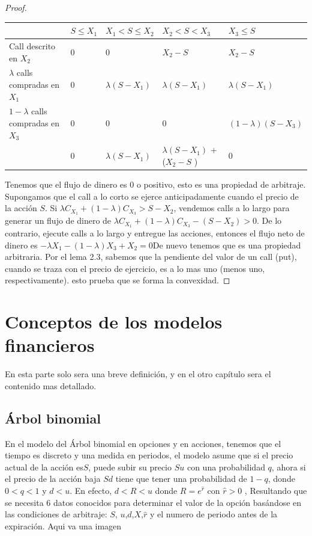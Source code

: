 \begin{defn}
\begin{proof}
								
							\begin{longtable}{|l|l|l|l|l|}
									\hline 
									& $ S\leq X_{1} $ & $ X_{1}< S \leq X_{2} $  & $ X_{2}<S<X_{3} $  & $ X_{3}\leq S $  \\ 
									\hline 
									Call descrito en $ X_{2} $& 0  & 0  & $ X_{2}-S $ & $ X_{2}-S $  \\ 
									\hline 
									$ \lambda $ calls compradas en $ X_{1} $& 0  & $ \lambda (S-X_{1}) $ &$ \lambda (S-X_{1}) $  & $ \lambda (S-X_{1}) $  \\ 
									\hline 
									$1- \lambda $ calls compradas en $ X_{3} $& 0  & 0  & 0 & $(1- \lambda )(S-X_{3}) $   \\ 
									\hline 
									& 0 &$ \lambda (S-X_{1}) $  & $ \lambda (S-X_{1}) $ + ($ X_{2}-S $ )  & 0 \\ 
									\hline 
							\end{longtable}  
								 Tenemos que el flujo de dinero es 0 o positivo, esto es una propiedad de arbitraje.
								 \newline
								 Supongamos que el call a lo corto se ejerce anticipadamente cuando el precio de la acción $ S $. Si 	$  \lambda C _{X_{1}} + (1-\lambda) C _{X_{3}}> S-X_{2} $, vendemos calls a lo largo para generar un flujo de dinero de 	$  \lambda C _{X_{1}} + (1-\lambda) C _{X_{3}} - (S-X_{2})>0 $. De lo contrario, ejecute calls a lo largo y entregue las acciones, entonces el flujo neto de  dinero es $ -\lambda X_{1}- (1-\lambda)X_{3}+X_{2} = 0  $De nuevo tenemos que es una propiedad arbitraria. \newline
								 Por el lema 2.3, sabemos que la pendiente del valor de un call (put), cuando se traza con el precio de ejercicio, es a lo mas uno (menos uno, respectivamente). esto prueba que se forma la convexidad.
									 \end{proof}
									 
									 \section	{Conceptos de los modelos financieros }
									En esta parte solo sera una breve definición, y en el otro capítulo sera el contenido mas detallado.
									\subsection	{Árbol binomial}
									
									En el  modelo del Árbol binomial en opciones y en acciones, tenemos que el tiempo es discreto y una medida en periodos, el modelo asume que si el precio actual de la acción es$ S $, puede subir su precio $ Su $ con una probabilidad $ q $, ahora si el precio de la acción baja $ Sd $ tiene que tener una probabilidad de $ 1-q $, donde $ 0<q<1 $ y $ d<u $. En efecto, $ d<R<u $ donde $ R=e^{\widehat{r}} $ con $ \widehat{r} >0 $ , Resultando que se necesita 6 datos conocidos para determinar el valor de la opción basándose en las condiciones de arbitraje: $ S $, $ u $,$ d $,$ X $,$ \widehat{r} $ y el numero de periodo antes de la expiración.
									\newline
									Aqui va una imagen

\end{defn}
